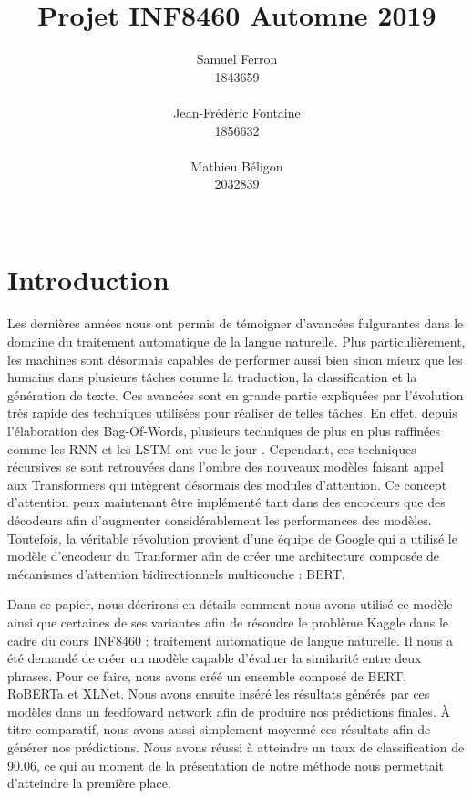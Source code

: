 \documentclass[11pt,a4paper, french]{article}
\title{Projet INF8460 Automne 2019 }
\author{Samuel Ferron \\
  1843659 \\
  {\tt } \\\And
  Jean-Frédéric Fontaine \\
  1856632 \\
  {\tt} \\\And
  Mathieu B\'eligon \\
  2032839\\
  {\tt } \\}
\date{}
\begin{document}
\maketitle

\section{Introduction}
Les dernières années nous ont permis de témoigner d’avancées fulgurantes dans le domaine du traitement automatique de la langue naturelle. Plus particulièrement, les machines sont désormais capables de performer aussi bien sinon mieux que les humains dans plusieurs tâches comme la traduction, la classification et la génération de texte. Ces avancées sont en grande partie expliquées par l’évolution très rapide des techniques utilisées pour réaliser de telles tâches. En effet, depuis l’élaboration des Bag-Of-Words, plusieurs techniques de plus en plus raffinées comme les RNN et les LSTM ont vue le jour \cite{lstm}. Cependant, ces techniques récursives se sont retrouvées dans l’ombre des nouveaux modèles faisant appel aux Transformers qui intègrent désormais des modules d’attention. Ce concept d’attention peux maintenant être implémenté tant dans des encodeurs que des décodeurs afin d’augmenter considérablement les performances des modèles. Toutefois, la véritable révolution provient d’une équipe de Google qui a utilisé le modèle d’encodeur du Tranformer afin de créer une architecture composée de mécanismes d’attention bidirectionnels multicouche : BERT.

Dans ce papier, nous décrirons en détails comment nous avons utilisé ce modèle ainsi que certaines de ses variantes afin de résoudre le problème Kaggle dans le cadre du cours INF8460 : traitement automatique de langue naturelle. Il nous a été demandé de créer un modèle capable d’évaluer la similarité entre deux phrases. Pour ce faire, nous avons créé un ensemble composé de BERT, RoBERTa et XLNet. Nous avons ensuite inséré les résultats générés par ces modèles dans un feedfoward network afin de produire nos prédictions finales. À titre comparatif, nous avons aussi simplement moyenné ces résultats afin de générer nos prédictions. Nous avons réussi à atteindre un taux de classification de 90.06, ce qui au moment de la présentation de notre méthode nous permettait d'atteindre la première place.
\end{document}
